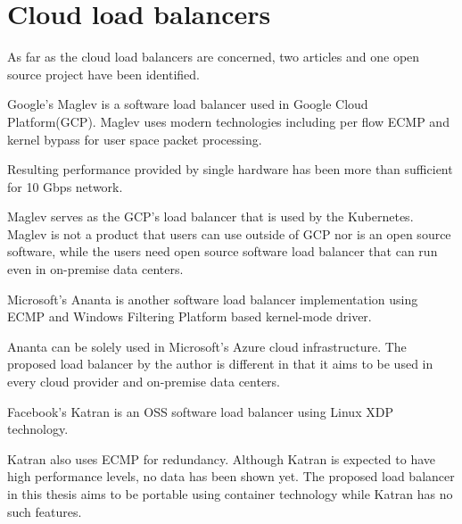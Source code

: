 \section{Cloud load balancers}



As far as the cloud load balancers are concerned, two articles and one open source project have been identified.

Google's Maglev \cite{eisenbud2016maglev} is a software load balancer used in Google Cloud Platform(GCP).
Maglev uses modern technologies including per flow ECMP and kernel bypass for user space packet processing.

Resulting performance provided by single hardware has been more than sufficient for 10 Gbps network.

Maglev serves as the GCP's load balancer that is used by the Kubernetes.
Maglev is not a product that users can use outside of GCP nor is an open source software, while the users need open source software load balancer that can run even in on-premise data centers.



Microsoft's Ananta \cite{patel2013ananta} is another software load balancer implementation using ECMP and Windows Filtering Platform based kernel-mode driver.

Ananta can be solely used in Microsoft's Azure cloud infrastructure\cite{patel2013ananta}.
The proposed load balancer by the author is different in that it aims to be used in every cloud provider and on-premise data centers.

Facebook's Katran \cite{2018katran} is an OSS software load balancer using Linux XDP technology.


Katran also uses ECMP for redundancy.
Although Katran is expected to have high performance levels, no data has been shown yet.
The proposed load balancer in this thesis aims to be portable using container technology while Katran has no such features.


